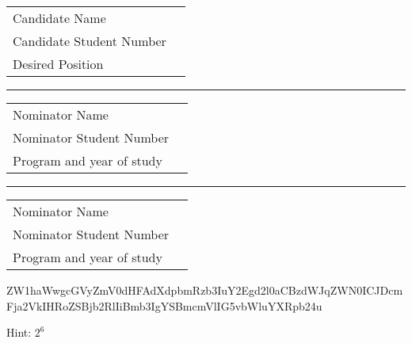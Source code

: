 \documentclass[12pt]{article}
\begin{document}
\maketitle
\begin{tabular}{ l l }
    Candidate Name & \underline{\hspace{5cm}}
    \\
    Candidate Student Number & \underline{\hspace{5cm}}
    \\
    Desired Position & \underline{\hspace{5cm}}
\end{tabular}

\vspace{10mm}
\hrule
\vspace{10mm}

\begin{tabular}{ l l }
    Nominator Name & \underline{\hspace{5cm}}
    \\
    Nominator Student Number & \underline{\hspace{5cm}}
    \\
    Program and year of study & \underline{\hspace{10cm}}
\end{tabular}

\vspace{10mm}
\hrule
\vspace{10mm}

\begin{tabular}{ l l }
    Nominator Name & \underline{\hspace{5cm}}
    \\
    Nominator Student Number & \underline{\hspace{5cm}}
    \\
    Program and year of study & \underline{\hspace{10cm}}
\end{tabular}

\vspace{20mm}
\begin{tiny}
  ZW1haWwgcGVyZmV0dHFAdXdpbmRzb3IuY2Egd2l0aCBzdWJqZWN0ICJDcmFja2VkIHRoZSBjb2RlIiBmb3IgYSBmcmVlIG5vbWluYXRpb24u
  \vspace{20mm}
  \begin{center}
    Hint: $2^6$
  \end{center}
\end{tiny}
\end{document}
